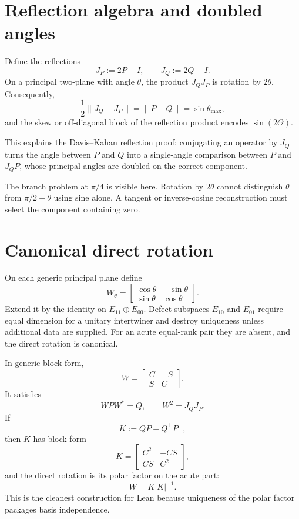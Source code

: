 \section{Reflection algebra and doubled angles}

Define the reflections
\[
  J_P:=2P-I,
  \qquad
  J_Q:=2Q-I.
\]
On a principal two-plane with angle $\theta$, the product $J_QJ_P$ is rotation by $2\theta$. Consequently,
\[
  \frac12\|J_Q-J_P\|
  =\|P-Q\|
  =\sin\theta_{\max},
\]
and the skew or off-diagonal block of the reflection product encodes $\sin(2\Theta)$.

This explains the Davis--Kahan reflection proof: conjugating an operator by $J_Q$ turns the angle between $P$ and $Q$ into a single-angle comparison between $P$ and $J_QP$, whose principal angles are doubled on the correct component.

The branch problem at $\pi/4$ is visible here. Rotation by $2\theta$ cannot distinguish $\theta$ from $\pi/2-\theta$ using sine alone. A tangent or inverse-cosine reconstruction must select the component containing zero.

\section{Canonical direct rotation}

On each generic principal plane define
\[
  W_\theta=
  \begin{bmatrix}
    \cos\theta&-\sin\theta\\
    \sin\theta&\cos\theta
  \end{bmatrix}.
\]
Extend it by the identity on $E_{11}\oplus E_{00}$. Defect subspaces $E_{10}$ and $E_{01}$ require equal dimension for a unitary intertwiner and destroy uniqueness unless additional data are supplied. For an acute equal-rank pair they are absent, and the direct rotation is canonical.

In generic block form,
\[
  W=
  \begin{bmatrix}
    C&-S\\
    S&C
  \end{bmatrix}.
\]
It satisfies
\[
  WPW^*=Q,
  \qquad
  W^2=J_QJ_P.
\]
If
\[
  K:=QP+Q^\perp P^\perp,
\]
then $K$ has block form
\[
  K=\begin{bmatrix}C^2&-CS\\CS&C^2\end{bmatrix},
\]
and the direct rotation is its polar factor on the acute part:
\[
  W=K|K|^{-1}.
\]
This is the cleanest construction for Lean because uniqueness of the polar factor packages basis independence.

